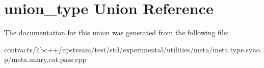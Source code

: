 \hypertarget{unionunion__type}{}\section{union\+\_\+type Union Reference}
\label{unionunion__type}


The documentation for this union was generated from the following file\+:\begin{DoxyCompactItemize}
\item 
contracts/libc++/upstream/test/std/experimental/utilities/meta/meta.\+type.\+synop/meta.\+unary.\+cat.\+pass.\+cpp\end{DoxyCompactItemize}
